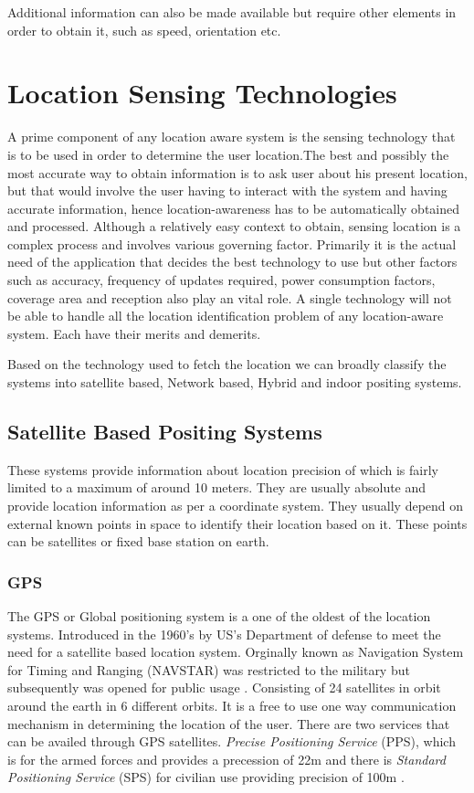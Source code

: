 \documentclass[12pt]{report}
\begin{document}
Additional information can also be made available but require other elements in order to obtain it, such as speed, orientation etc.

\section {Location Sensing Technologies}
A prime component of any location aware system is the sensing technology that is to be used in order to determine the user location.The best and possibly the most accurate way to obtain information is to ask user about his present location, but that would involve the user having to interact with the system and having accurate information, hence location-awareness has to be automatically obtained and processed. Although a relatively easy context to obtain, sensing location is a complex process  and involves various governing factor. Primarily it is the actual need of the application that decides the best technology to use but other factors such as accuracy, frequency of updates required, power consumption factors, coverage area and reception also play an vital role. A single technology will not be able to handle all the location identification problem of any location-aware system. Each have their merits and demerits.  

Based on the technology used to fetch the location we can broadly classify the systems into satellite based, Network based, Hybrid and indoor positing systems.

\subsection{Satellite Based Positing Systems}
These systems provide information about location precision of which is fairly limited to a maximum of around 10 meters. They are usually absolute and provide location information as per a coordinate system. They usually depend on external known points in space to identify their location based on it. These points can be satellites or fixed base station on earth.

\subsubsection{GPS}
The GPS or Global positioning system is a one of the oldest of the location systems. Introduced in the 1960's by US's Department of defense to meet the need for a satellite based location system. Orginally known as Navigation System for Timing and Ranging (NAVSTAR) was restricted to the military but subsequently was opened for public usage \cite{ta2011global}. Consisting of 24 satellites in orbit around the earth in 6 different orbits. It is a free to use one way communication mechanism in determining the location of the user. There are two services that can be availed through GPS satellites. \textit{Precise Positioning Service} (PPS), which is for the armed forces and provides a precession of 22m and there is \textit{Standard Positioning Service} (SPS) for civilian use providing precision of 100m \cite{schiller2004location}.
 
\end{document}
